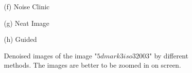 \documentclass[10pt,twocolumn,letterpaper]{article}
\begin{document}
\begin{figure}
{\begin{minipage}[t]{0.244\textwidth}
{\footnotesize (f) Noise Clinic \cite{noiseclinic}  }
\end{minipage}
\begin{minipage}[t]{0.244\textwidth}
\centering
{}
{\footnotesize (g) Neat Image \cite{neatimage}   }
\end{minipage}
\begin{minipage}[t]{0.244\textwidth}
\centering
{}
{\footnotesize (h) Guided  }
\end{minipage}
}
\caption{Denoised images of the image "$5dmark3 iso3200 3$" by different methods. The images are better to be zoomed in on screen.}
\label{fig7}
\end{figure}
\end{document}
